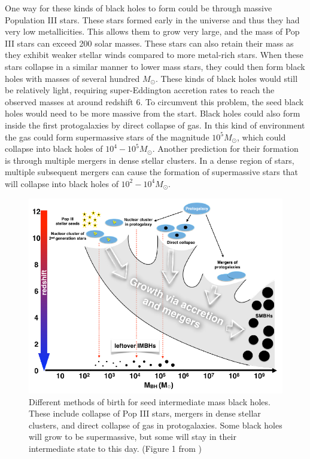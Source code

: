 \documentclass[english, oneside]{HYgradu}
\begin{document}
One way for these kinds of black holes to form could be through massive Population III stars. These stars formed early in the universe and thus they had very low metallicities. This allows them to grow very large, and the mass of Pop III stars can exceed 200 solar masses. These stars can also retain their mass as they exhibit weaker stellar winds compared to more metal-rich stars. When these stars collapse in a similar manner to lower mass stars, they could then form black holes with masses of several hundred $M_\odot$. These kinds of black holes would still be relatively light, requiring super-Eddington accretion rates to reach the observed masses at around redshift 6. To circumvent this problem, the seed black holes would need to be more massive from the start. Black holes could also form inside the first protogalaxies by direct collapse of gas. In this kind of environment the gas could form supermassive stars of the magnitude $10^5 M_\odot$, which could collapse into black holes of $10^4 - 10^5 M_\odot$. Another prediction for their formation is through multiple mergers in dense stellar clusters. In a dense region of stars, multiple subsequent mergers can cause the formation of supermassive stars that will collapse into black holes of $10^2 - 10^4 M_\odot$.

\begin{figure}[h!tb]
\centering
\includegraphics[width=\textwidth]{../images/imbhs.pdf}
\caption{Different methods of birth for seed intermediate mass black holes. These include collapse of Pop III stars, mergers in dense stellar clusters, and direct collapse of gas in protogalaxies. Some black holes will grow to be supermassive, but some will stay in their intermediate state to this day.
(Figure 1 from \cite{mezcua:2017})}
\label{fig:imbhs}
\end{figure}
\end{document}
